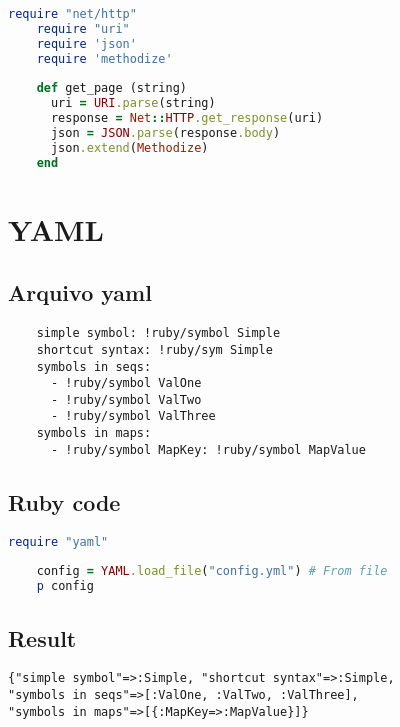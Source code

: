 \documentclass[serif,mathserif]{book}
\begin{document}
\begin{lstlisting}[language=ruby]
	require "net/http"
	require "uri"
	require 'json'
	require 'methodize'
	
	def get_page (string)
	  uri = URI.parse(string)
	  response = Net::HTTP.get_response(uri)
	  json = JSON.parse(response.body)
	  json.extend(Methodize)
	end
\end{lstlisting}

\section{YAML}

\subsection{Arquivo yaml}

\begin{verbatim}
	simple symbol: !ruby/symbol Simple 
	shortcut syntax: !ruby/sym Simple 
	symbols in seqs: 
	  - !ruby/symbol ValOne 
	  - !ruby/symbol ValTwo 
	  - !ruby/symbol ValThree 
	symbols in maps: 
	  - !ruby/symbol MapKey: !ruby/symbol MapValue 
\end{verbatim}

\subsection{Ruby code}

\begin{lstlisting}[language=ruby]
	require "yaml"
	
	config = YAML.load_file("config.yml") # From file
	p config
\end{lstlisting}

\subsection{Result}

\begin{verbatim}
{"simple symbol"=>:Simple, "shortcut syntax"=>:Simple, 
"symbols in seqs"=>[:ValOne, :ValTwo, :ValThree], 
"symbols in maps"=>[{:MapKey=>:MapValue}]}
\end{verbatim}




\end{document}
